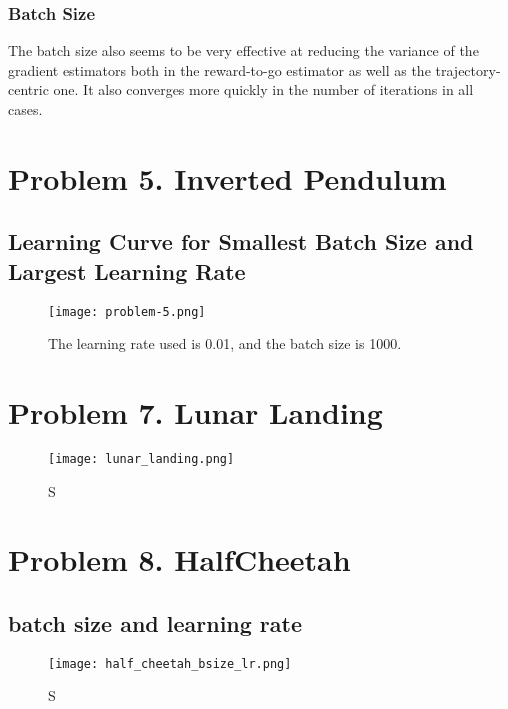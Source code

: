 \documentclass[a4paper]{article}
\begin{document}
\subsubsection*{Batch Size}
The batch size also seems to be very effective at reducing the variance of the gradient estimators both in the reward-to-go estimator as well as the trajectory-centric one. It also converges more quickly in the number of iterations in all cases. 

\section*{Problem 5. Inverted Pendulum}
\subsection*{Learning Curve for Smallest Batch Size and Largest Learning Rate}
\begin{figure}[H]
\centering
\texttt{[image: problem-5.png]}
\caption{The learning rate used is 0.01, and the batch size is 1000.}
\end{figure}

\section*{Problem 7. Lunar Landing}
\begin{figure}[H]
\centering
\texttt{[image: lunar\_landing.png]}
\caption{S}
\end{figure} 


\section*{Problem 8. HalfCheetah}
\subsection*{batch size and learning rate}
\begin{figure}[H]
\centering
\texttt{[image: half\_cheetah\_bsize\_lr.png]}
\caption{S}
\end{figure}
\end{document}
